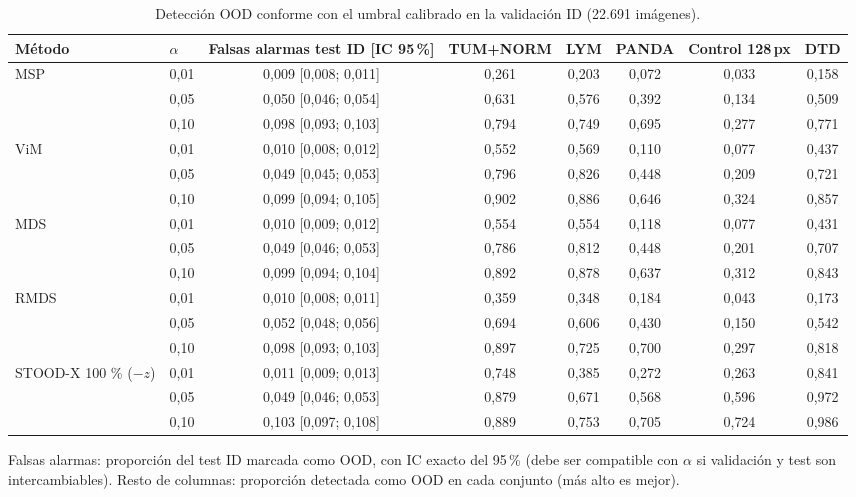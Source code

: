 \begin{table}
\centering
\scriptsize
\setlength{\tabcolsep}{3pt}
\caption{Detección OOD conforme con el umbral calibrado en la validación ID (22.691 imágenes).}
\label{tab:conforme-ood}
\begin{tabular*}{\linewidth}{@{\extracolsep{\fill}}llcccccc}
\toprule
Método & $\alpha$ & Falsas alarmas test ID [IC 95\,\%] & TUM+NORM & LYM & PANDA & Control 128\,px & DTD \\
\midrule
MSP & 0{,}01 & 0{,}009 [0{,}008; 0{,}011] & 0{,}261 & 0{,}203 & 0{,}072 & 0{,}033 & 0{,}158 \\
 & 0{,}05 & 0{,}050 [0{,}046; 0{,}054] & 0{,}631 & 0{,}576 & 0{,}392 & 0{,}134 & 0{,}509 \\
 & 0{,}10 & 0{,}098 [0{,}093; 0{,}103] & 0{,}794 & 0{,}749 & 0{,}695 & 0{,}277 & 0{,}771 \\
\midrule
ViM & 0{,}01 & 0{,}010 [0{,}008; 0{,}012] & 0{,}552 & 0{,}569 & 0{,}110 & 0{,}077 & 0{,}437 \\
 & 0{,}05 & 0{,}049 [0{,}045; 0{,}053] & 0{,}796 & 0{,}826 & 0{,}448 & 0{,}209 & 0{,}721 \\
 & 0{,}10 & 0{,}099 [0{,}094; 0{,}105] & 0{,}902 & 0{,}886 & 0{,}646 & 0{,}324 & 0{,}857 \\
\midrule
MDS & 0{,}01 & 0{,}010 [0{,}009; 0{,}012] & 0{,}554 & 0{,}554 & 0{,}118 & 0{,}077 & 0{,}431 \\
 & 0{,}05 & 0{,}049 [0{,}046; 0{,}053] & 0{,}786 & 0{,}812 & 0{,}448 & 0{,}201 & 0{,}707 \\
 & 0{,}10 & 0{,}099 [0{,}094; 0{,}104] & 0{,}892 & 0{,}878 & 0{,}637 & 0{,}312 & 0{,}843 \\
\midrule
RMDS & 0{,}01 & 0{,}010 [0{,}008; 0{,}011] & 0{,}359 & 0{,}348 & 0{,}184 & 0{,}043 & 0{,}173 \\
 & 0{,}05 & 0{,}052 [0{,}048; 0{,}056] & 0{,}694 & 0{,}606 & 0{,}430 & 0{,}150 & 0{,}542 \\
 & 0{,}10 & 0{,}098 [0{,}093; 0{,}103] & 0{,}897 & 0{,}725 & 0{,}700 & 0{,}297 & 0{,}818 \\
\midrule
STOOD-X 100 \% ($-z$) & 0{,}01 & 0{,}011 [0{,}009; 0{,}013] & 0{,}748 & 0{,}385 & 0{,}272 & 0{,}263 & 0{,}841 \\
 & 0{,}05 & 0{,}049 [0{,}046; 0{,}053] & 0{,}879 & 0{,}671 & 0{,}568 & 0{,}596 & 0{,}972 \\
 & 0{,}10 & 0{,}103 [0{,}097; 0{,}108] & 0{,}889 & 0{,}753 & 0{,}705 & 0{,}724 & 0{,}986 \\
\bottomrule
\end{tabular*}

\smallskip
\parbox{\linewidth}{\scriptsize Falsas alarmas: proporción del test ID marcada como OOD, con IC exacto del 95\,\% (debe ser compatible con $\alpha$ si validación y test son intercambiables). Resto de columnas: proporción detectada como OOD en cada conjunto (más alto es mejor).}
\end{table}
